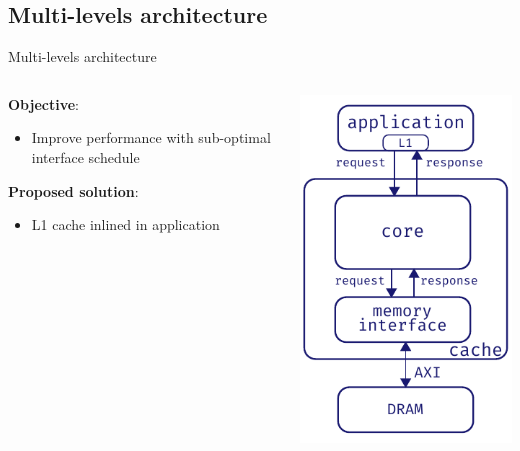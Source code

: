 \documentclass[aspectratio=169]{beamer}
\begin{document}
\subsection{Multi-levels architecture}
\begin{frame}{Multi-levels architecture}
	\begin{columns}
		\begin{column}{.5\textwidth}
			\textbf{Objective}:
			\begin{itemize}
				\item Improve performance with sub-optimal
					interface schedule
			\end{itemize}
			
			\bigskip
			\textbf{Proposed solution}:
			\begin{itemize}
				\item L1 cache inlined in application
			\end{itemize}
		\end{column}
		\begin{column}{.5\textwidth}
			\begin{center}
			\includegraphics[height=.7\textheight]{l1_arch}
			\end{center}
		\end{column}
	\end{columns}
\end{frame}
\end{document}
